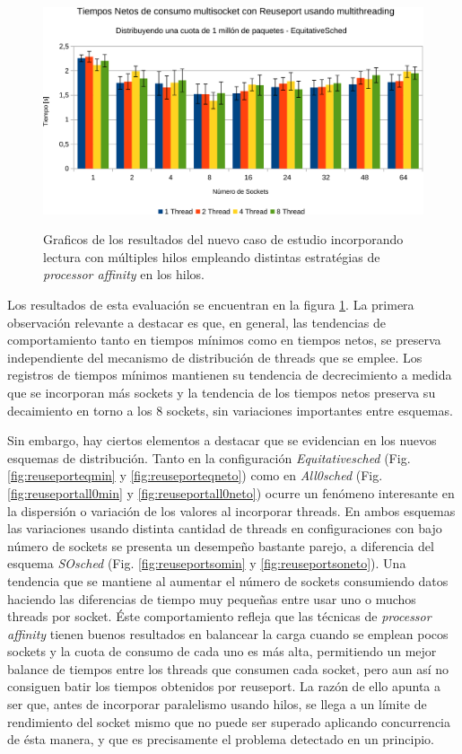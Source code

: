 \begin{figure}[h!]
{		\centering
		\includegraphics[width=.47\textwidth]{resultados/reuseport36-crop.pdf}
		\label{fig:reuseporteqneto}
	}
	\caption{Graficos de los resultados del nuevo caso de estudio incorporando lectura con múltiples hilos empleando distintas estratégias de \emph{processor affinity} en los hilos.}
	\label{fig:resultadosReuseport3}
\end{figure}

Los resultados de esta evaluación se encuentran en la figura \ref{fig:resultadosReuseport3}. La primera observación relevante a destacar es que, en general, las tendencias de comportamiento tanto en tiempos mínimos como en tiempos netos, se preserva independiente del mecanismo de distribución de threads que se emplee. Los registros de tiempos mínimos mantienen su tendencia de decrecimiento a medida que se incorporan más sockets y la tendencia de los tiempos netos preserva su decaimiento en torno a los 8 sockets, sin variaciones importantes entre esquemas.

Sin embargo, hay ciertos elementos a destacar que se evidencian en los nuevos esquemas de distribución. Tanto en la configuración \emph{Equitativesched} (Fig. \ref{fig:reuseporteqmin} y \ref{fig:reuseporteqneto}) como en \emph{All0sched} (Fig. \ref{fig:reuseportall0min} y \ref{fig:reuseportall0neto}) ocurre un fenómeno interesante en la dispersión o variación de los valores al incorporar threads. En ambos esquemas las variaciones usando distinta cantidad de threads en configuraciones con bajo número de sockets se presenta un desempeño bastante parejo, a diferencia del esquema \emph{SOsched} (Fig. \ref{fig:reuseportsomin} y \ref{fig:reuseportsoneto}). Una tendencia que se mantiene al aumentar el número de sockets consumiendo datos haciendo las diferencias de tiempo muy pequeñas entre usar uno o muchos threads por socket. Éste comportamiento refleja que las técnicas de \emph{processor affinity} tienen buenos resultados en balancear la carga cuando se emplean pocos sockets y la cuota de consumo de cada uno es más alta, permitiendo un mejor balance de tiempos entre los threads que consumen cada socket, pero aun así no consiguen batir los tiempos obtenidos por reuseport. La razón de ello apunta a ser que, antes de incorporar paralelismo usando hilos, se llega a un límite de rendimiento del socket mismo que no puede ser superado aplicando concurrencia de ésta manera, y que es precisamente el problema detectado en un principio.

